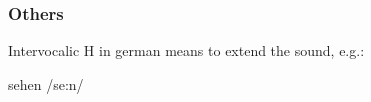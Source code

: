 \subsubsection{Others}

Intervocalic H in german means to extend the sound, e.g.:

\begin{center}
    sehen /se:n/
\end{center}


